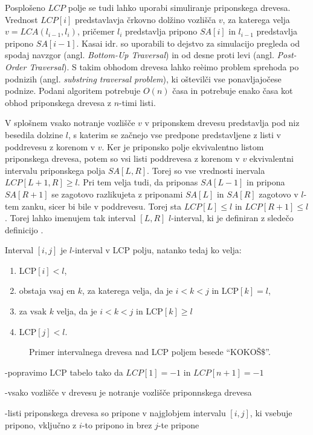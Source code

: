 Posplošeno $LCP$ polje se tudi lahko uporabi simuliranje priponskega drevesa. Vrednost $LCP[i]$ predstavlavja črkovno dolžino vozlišča $v$, za katerega velja $v=LCA(l_{i-1},l_i)$, pričemer $l_i$ predstavlja pripono $SA[i]$ in $l_{i-1}$ predstavlja pripono $SA[i-1]$. Kasai idr. \cite{Kasai2001} so uporabili to dejstvo za simulacijo pregleda od spodaj navzgor (angl. \textit{Bottom-Up Traversal}) in od desne proti levi (angl. \textit{Post-Order Traversal}). S takim obhodom drevesa lahko reèimo problem sprehoda po podnizih (angl. \textit{substring traversal problem}), ki oštevilči vse ponavljajočese podnize. Podani algoritem potrebuje $O(n)$ časa in potrebuje enako časa kot obhod priponskega drevesa z $n$-timi listi.

V splošnem vsako notranje vozlišče $v$ v priponskem drevesu predstavlja pod niz besedila dolzine $l$, s katerim se začnejo vse predpone predstavljene z listi v poddrevesu z korenom v $v$. Ker je priponsko polje ekvivalentno listom priponskega drevesa, potem so vsi listi poddrevesa z korenom v $v$ ekvivalentni intervalu priponskega polja $SA[L,R]$. Torej so vse vrednosti inervala $LCP[L+1,R]\ge l$. Pri tem velja tudi, da priponas $SA[L-1]$ in pripona $SA[R+1]$ se zagotovo razlikujeta z priponami $SA[L]$ in $SA[R]$ zagotovo v $l$-tem zanku, sicer bi bile v poddrevesu. Torej sta $LCP[L]\le l$ in $LCP[R+1]\le l$. Torej lahko imenujem tak interval $[L,R]$ $l$-interval, ki je definiran z sledečo definicijo \cite{Abouelhoda2004}.
\begin{defi}
    Interval $[i,j]$ je $l$-interval v LCP polju, natanko tedaj ko velja:
    \begin{enumerate}
        \item LCP$[i]<l$,
        \item obstaja vsaj en $k$, za katerega velja, da je $i< k< j$ in LCP$[k]=l$,
        \item za vsak $k$ velja, da je $i< k< j$ in LCP$[k]\ge l$
        \item LCP$[j]<l$.      
    \end{enumerate}
\end{defi}



\begin{figure}[htb]
    \begin{subfigure}[T]{0.45\linewidth}
        
        
        \centering
        \subcaption*{}
        \label{fig:aSADrevo}
    \end{subfigure}
    \begin{subfigure}[T]{0.45\linewidth}        
        
        \centering
        \subcaption*{}
        \label{fig:aSAPolje}
    \end{subfigure}
    \caption{Primer intervalnega drevesa nad LCP poljem besede \enquote{KOKOŠ$\$$}.} 
    \label{fig:intervalTree}
\end{figure}

-popravimo LCP tabelo tako da $LCP[1]=-1$ in $LCP[n+1]=-1$

-vsako vozlišče v drevesu je notranje vozlišče priponnskega drevesa

-listi priponskega drevesa so pripone v najglobjem intervalu $[i,j]$, ki vsebuje pripono, vključno z $i$-to pripono in brez $j$-te pripone \cite{Abouelhoda2004}



